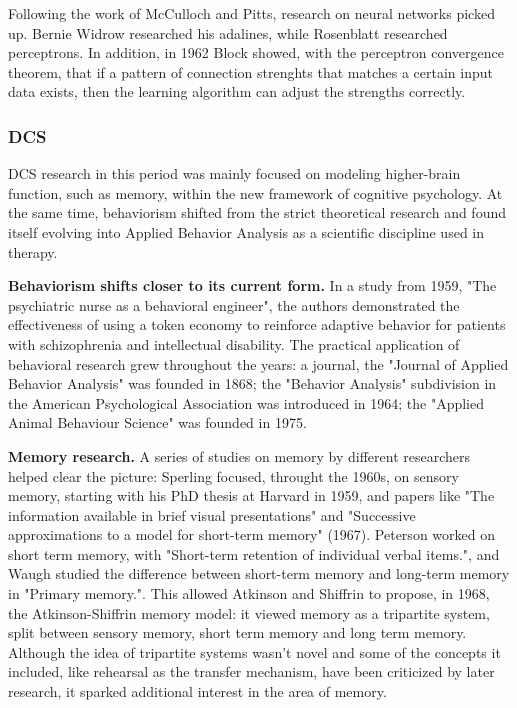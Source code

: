 \documentclass[../main.tex]{subfiles}
\begin{document}
Following the work of McCulloch and Pitts, research on neural networks picked up. Bernie Widrow researched his adalines\cite{widrowAssociativeStorageRetrieval1962}, while Rosenblatt researched perceptrons. In addition, in 1962 Block showed, with the perceptron convergence theorem, that if a pattern of connection strenghts that matches a certain input data exists, then the learning algorithm can adjust the strengths correctly\cite{russellArtificialIntelligenceModern2002}.

\subsubsection{DCS}
DCS research in this period was mainly focused on modeling higher-brain function, such as memory, within the new framework of cognitive psychology. At the same time, behaviorism shifted from the strict theoretical research and found itself evolving into Applied Behavior Analysis as a scientific discipline used in therapy.

\vspace{4pt}
\textbf{Behaviorism shifts closer to its current form.} In a study from 1959, "The psychiatric nurse as a behavioral engineer"\cite{ayllonPsychiatricNurseBehavioral1959}, the authors demonstrated the effectiveness of using a token economy to reinforce adaptive behavior for patients with schizophrenia and intellectual disability. The practical application of behavioral research grew throughout the years: a journal, the "Journal of Applied Behavior Analysis" was founded in 1868; the "Behavior Analysis" subdivision in the American Psychological Association was introduced in 1964; the "Applied Animal Behaviour Science" was founded in 1975.

\vspace{4pt}
\textbf{Memory research.} A series of studies on memory by different researchers helped clear the picture: Sperling focused, throught the 1960s, on sensory memory, starting with his PhD thesis at Harvard in 1959, and papers like "The information available in brief visual presentations"\cite{sperlingInformationAvailableBrief1960} and "Successive approximations to a model for short-term memory" (1967). Peterson worked on short term memory, with "Short-term retention of individual verbal items."\cite{petersonShorttermRetentionIndividual1959}, and Waugh studied the difference between short-term memory and long-term memory in "Primary memory."\cite{waughPrimaryMemory1965}. This allowed Atkinson and Shiffrin to propose, in 1968, the Atkinson-Shiffrin memory model: it viewed memory as a tripartite system, split between sensory memory, short term memory and long term memory. Although the idea of tripartite systems wasn't novel \cite{jamesPrinciplesPsychology1890} and some of the concepts it included, like rehearsal as the transfer mechanism, have been criticized by later research, it sparked additional interest in the area of memory.
\end{document}
